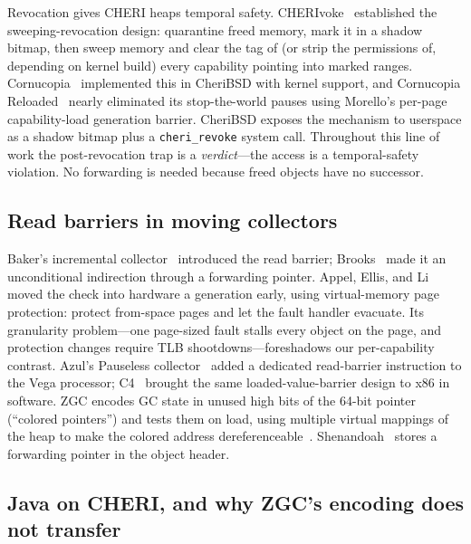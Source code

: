 \documentclass[acmsmall,nonacm,screen]{acmart}
\begin{document}
Revocation gives CHERI heaps temporal safety.
CHERIvoke~\cite{cherivoke} established the sweeping-revocation design:
quarantine freed memory, mark it in a shadow bitmap, then sweep memory
and clear the tag of (or strip the permissions of, depending on kernel
build) every capability pointing into marked ranges.
Cornucopia~\cite{cornucopia} implemented this in CheriBSD with kernel
support, and Cornucopia Reloaded~\cite{cornucopia-reloaded} nearly
eliminated its stop-the-world pauses using Morello's per-page
capability-load generation barrier. CheriBSD exposes the mechanism to
userspace as a shadow bitmap plus a \texttt{cheri\_revoke} system call.
Throughout this line of work the post-revocation trap is a
\emph{verdict}---the access is a temporal-safety violation. No
forwarding is needed because freed objects have no successor.

\subsection{Read barriers in moving collectors}

Baker's incremental collector~\cite{baker78} introduced the read
barrier; Brooks~\cite{brooks84} made it an unconditional indirection
through a forwarding pointer. Appel, Ellis, and
Li~\cite{appel-ellis-li} moved the check into hardware a generation
early, using virtual-memory page protection: protect from-space pages
and let the fault handler evacuate. Its granularity problem---one
page-sized fault stalls every object on the page, and protection
changes require TLB shootdowns---foreshadows our per-capability
contrast. Azul's Pauseless collector~\cite{pauseless} added a dedicated
read-barrier instruction to the Vega processor; C4~\cite{c4} brought
the same loaded-value-barrier design to x86 in software. ZGC encodes
GC state in unused high bits of the 64-bit pointer (``colored
pointers'') and tests them on load, using multiple virtual mappings of
the heap to make the colored address dereferenceable~\cite{zgc-toplas}.
Shenandoah~\cite{shenandoah} stores a forwarding pointer in the object
header.

\subsection{Java on CHERI, and why ZGC's encoding does not transfer}
\label{sec:bg:zgc}
\end{document}
